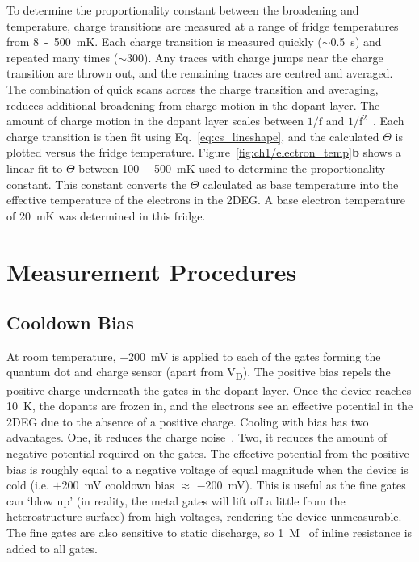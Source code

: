 To determine the proportionality constant between the broadening and temperature, charge transitions are measured at a range of fridge temperatures from \qty{8}{}~-~\qty{500}{mK}. Each charge transition is measured quickly ($\sim$\qty{0.5}{s}) and repeated many times ($\sim$\qty{300}{}). Any traces with charge jumps near the charge transition are thrown out, and the remaining traces are centred and averaged. The combination of quick scans across the charge transition and averaging, reduces additional broadening from charge motion in the dopant layer. The amount of charge motion in the dopant layer scales between $\mathrm{1/f}$ and $\mathrm{1/f^2}$~\cite{charge_noise}. Each charge transition is then fit using Eq.~\ref{eq:cs_lineshape}, and the calculated $\Theta$ is plotted versus the fridge temperature. Figure~\ref{fig:ch1/electron_temp}\textbf{b} shows a linear fit to $\Theta$ between \qty{100}{}~-~\qty{500}{mK} used to determine the proportionality constant. This constant converts the $\Theta$ calculated as base temperature into the effective temperature of the electrons in the 2DEG. A base electron temperature of \qty{20}{mK} was determined in this fridge.



\afterpage{\clearpage}
\section{Measurement Procedures}

\subsection{Cooldown Bias}
At room temperature, $+$\qty{200}{mV} is applied to each of the gates forming the quantum dot and charge sensor (apart from V\textsubscript{D}). The positive bias repels the positive charge underneath the gates in the dopant layer. Once the device reaches \qty{10}{K}, the dopants are frozen in, and the electrons see an effective potential in the 2DEG due to the absence of a positive charge. Cooling with bias has two advantages. One, it reduces the charge noise~\cite{bias_cooling}. Two, it reduces the amount of negative potential required on the gates. The effective potential from the positive bias is roughly equal to a negative voltage of equal magnitude when the device is cold (i.e. $+$\qty{200}{mV} cooldown bias $\approx$ $-$\qty{200}{mV}). This is useful as the fine gates can `blow up' (in reality, the metal gates will lift off a little from the heterostructure surface) from high voltages, rendering the device unmeasurable. The fine gates are also sensitive to static discharge, so \qty{1}{M\Omega} of inline resistance is added to all gates. 

